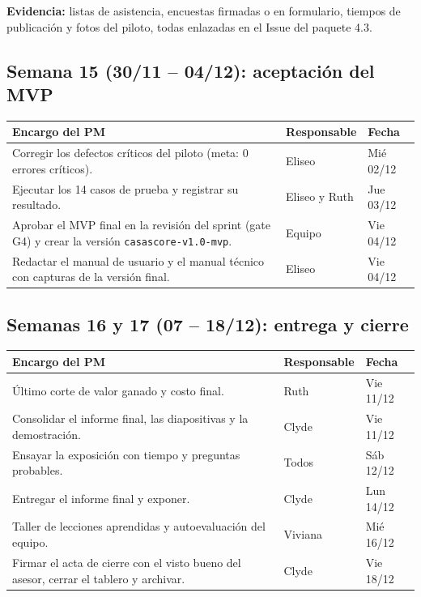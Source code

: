 \documentclass[11pt,a4paper]{article}
\begin{document}
\vspace{0.1cm}
\noindent\textbf{Evidencia:} listas de asistencia, encuestas firmadas o en formulario, tiempos de publicación y fotos del piloto, todas enlazadas en el Issue del paquete 4.3.

\subsection{Semana 15 (30/11 -- 04/12): aceptación del MVP}
{\small
{}
\noindent\begin{tabularx}{\textwidth}{@{}L P{2.7cm} C{1.6cm}@{}}
\toprule
{}
\textbf{Encargo del PM} & \textbf{Responsable} & \textbf{Fecha} \\
\midrule
Corregir los defectos críticos del piloto (meta: 0 errores críticos). & Eliseo & Mié 02/12 \\
Ejecutar los 14 casos de prueba y registrar su resultado. & Eliseo y Ruth & Jue 03/12 \\
Aprobar el MVP final en la revisión del sprint (gate G4) y crear la versión \texttt{casascore-v1.0-mvp}. & Equipo & Vie 04/12 \\
Redactar el manual de usuario y el manual técnico con capturas de la versión final. & Eliseo & Vie 04/12 \\
\bottomrule
\end{tabularx}
}

\subsection{Semanas 16 y 17 (07 -- 18/12): entrega y cierre}
{\small
{}
\noindent\begin{tabularx}{\textwidth}{@{}L P{2.7cm} C{1.6cm}@{}}
\toprule
{}
\textbf{Encargo del PM} & \textbf{Responsable} & \textbf{Fecha} \\
\midrule
Último corte de valor ganado y costo final. & Ruth & Vie 11/12 \\
Consolidar el informe final, las diapositivas y la demostración. & Clyde & Vie 11/12 \\
Ensayar la exposición con tiempo y preguntas probables. & Todos & Sáb 12/12 \\
Entregar el informe final y exponer. & Clyde & Lun 14/12 \\
Taller de lecciones aprendidas y autoevaluación del equipo. & Viviana & Mié 16/12 \\
Firmar el acta de cierre con el visto bueno del asesor, cerrar el tablero y archivar. & Clyde & Vie 18/12 \\
\bottomrule
\end{tabularx}
}
\end{document}
